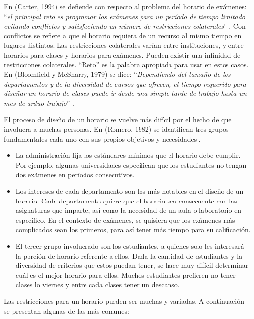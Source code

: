En (Carter, 1994) se defiende con respecto al problema del horario de exámenes: ``\emph{el principal reto es programar los exámenes para un período de tiempo limitado evitando conflictos y satisfaciendo un número de restricciones
colaterales}'' \cite{Carter's summary}. Con conflictos se refiere a que el horario requiera de un recurso
al mismo tiempo en lugares distintos. Las restricciones colaterales var\'ian entre instituciones, y entre
horarios para clases y horarios para exámenes. Pueden existir una infinidad de restricciones colaterales.
``Reto'' es la palabra apropiada para usar en estos casos.
En (Bloomfield y McSharry, 1979) se dice: ``\emph{Dependiendo del tamaño de los departamentos y de la diversidad
de cursos que ofrecen, el tiempo requerido para diseñar un horario de clases puede ir desde una simple
tarde de trabajo hasta un mes de arduo trabajo}'' \cite{Bloomfield and McSharry says}.

El proceso de diseño de un horario se vuelve más difícil por el hecho de que involucra a muchas personas.
En (Romero, 1982) se identifican tres grupos fundamentales cada uno con sus propios objetivos y necesidades \cite{Romero}.

\begin{itemize}
	\item La administración fija los estándares  mínimos que el horario debe cumplir. Por ejemplo, algunas
		universidades especifican que los estudiantes no tengan dos exámenes en períodos consecutivos.
	\item Los intereses de cada departamento son los más notables en el diseño de un horario. Cada departamento
		quiere que el horario sea consecuente con las asignaturas que imparte, as\'i como la necesidad de un
		aula o laboratorio en específico. En el contexto de exámenes, se quisiera que los exámenes más complicados
		sean los primeros, para as\'i tener más tiempo para su calificación.
	\item El tercer grupo involucrado son los estudiantes, a quienes solo les interesará la porción de horario
		referente a ellos. Dada la cantidad de estudiantes y la diversidad de criterios que estos puedan tener,
		se hace muy difícil determinar cu\'al es el mejor horario para ellos. Muchos estudiantes prefieren no
		tener clases lo viernes y entre cada clases tener un descanso.		
\end{itemize}

Las restricciones para un horario pueden ser muchas y variadas. A continuación se presentan algunas de 
las más comunes:

